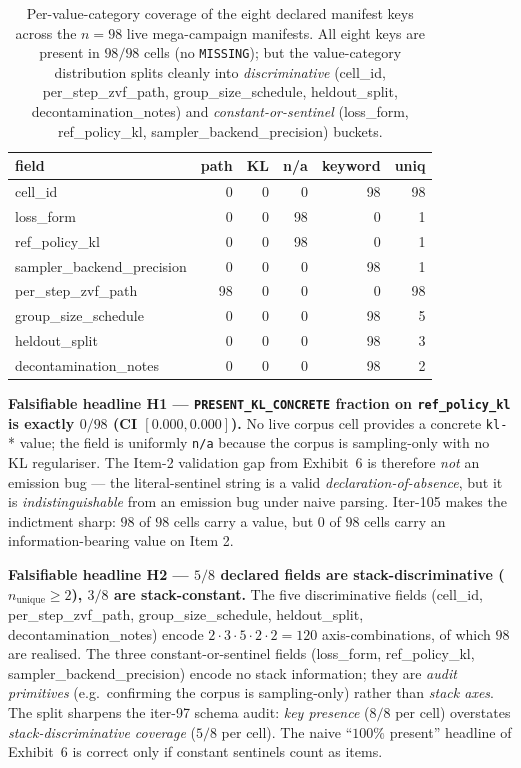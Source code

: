 \documentclass{article}  \usepackage[preprint,nonatbib]{neurips_2026} \usepackage[numbers]{natbib}
\begin{document}
\begin{table}[t]
\centering
\caption{Per-value-category coverage of the eight declared manifest keys
across the $n{=}98$ live mega-campaign manifests. All eight keys are
present in $98/98$ cells (no \texttt{MISSING}); but the value-category
distribution splits cleanly into \emph{discriminative} (cell_id,
per\_step\_zvf\_path, group\_size\_schedule, heldout\_split,
decontamination\_notes) and \emph{constant-or-sentinel} (loss\_form,
ref\_policy\_kl, sampler\_backend\_precision) buckets.}
\label{tab:p5-iter105-coverage}
\small
\begin{tabular}{@{}lrrrrr@{}}
\toprule
field & path & KL & n/a & keyword & uniq \\
\midrule
cell\_id                     &   0 &   0 &  0 &  98 &  98 \\
loss\_form                   &   0 &   0 & 98 &   0 &   1 \\
ref\_policy\_kl               &   0 &   0 & 98 &   0 &   1 \\
sampler\_backend\_precision   &   0 &   0 &  0 &  98 &   1 \\
per\_step\_zvf\_path          &  98 &   0 &  0 &   0 &  98 \\
group\_size\_schedule         &   0 &   0 &  0 &  98 &   5 \\
heldout\_split               &   0 &   0 &  0 &  98 &   3 \\
decontamination\_notes       &   0 &   0 &  0 &  98 &   2 \\
\bottomrule
\end{tabular}
\end{table}

\textbf{Falsifiable headline H1 --- \texttt{PRESENT\_KL\_CONCRETE}
fraction on \texttt{ref\_policy\_kl} is exactly $0/98$ (CI $[0.000,0.000]$).}
No live corpus cell provides a concrete \texttt{kl-}* value; the field is
uniformly \texttt{n/a} because the corpus is sampling-only with no KL
regulariser. The Item-2 validation gap from Exhibit~6 is therefore
\emph{not} an emission bug --- the literal-sentinel string is a valid
\emph{declaration-of-absence}, but it is \emph{indistinguishable} from an
emission bug under naive parsing. Iter-105 makes the indictment sharp:
$98$ of $98$ cells carry a value, but $0$ of $98$ cells carry an
information-bearing value on Item 2.

\textbf{Falsifiable headline H2 --- $5/8$ declared fields are
stack-discriminative ($n_{\text{unique}} \ge 2$), $3/8$ are
stack-constant.}
The five discriminative fields (cell\_id, per\_step\_zvf\_path,
group\_size\_schedule, heldout\_split, decontamination\_notes) encode
$2 \cdot 3 \cdot 5 \cdot 2 \cdot 2 = 120$ axis-combinations, of which
$98$ are realised. The three constant-or-sentinel fields
(loss\_form, ref\_policy\_kl, sampler\_backend\_precision) encode no
stack information; they are \emph{audit primitives} (e.g.\ confirming
the corpus is sampling-only) rather than \emph{stack axes}. The split
sharpens the iter-97 schema audit: \emph{key presence} ($8/8$ per
cell) overstates \emph{stack-discriminative coverage} ($5/8$ per cell).
The naive ``$100\%$ present'' headline of Exhibit~6 is correct only if
constant sentinels count as items.
\end{document}

